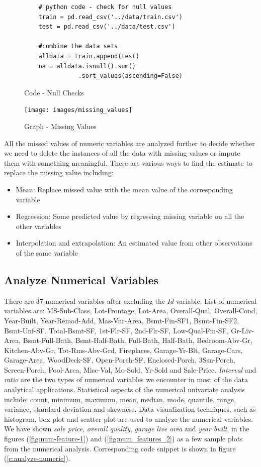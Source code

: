 \documentclass[sigconf]{acmart}
\begin{document}
	\begin{figure}[htb]
	\begin{verbatim}		
	# python code - check for null values
	train = pd.read_csv('../data/train.csv')
	test = pd.read_csv('../data/test.csv')
		
	#combine the data sets
	alldata = train.append(test)	
	na = alldata.isnull().sum()
	           .sort_values(ascending=False)
	\end{verbatim}
	\caption{Code - Null Checks}\label{c:check-nulls}
	\end{figure}
	
	\begin{figure}[htb]
		\centering
		\texttt{[image: images/missing\_values]}	
		\caption{Graph - Missing Values} \label{fig:missing-values} 
	\end{figure}

	All the missed values of numeric variables are analyzed further to decide whether we need to delete the instances of all the data with missing values or impute them with something meaningful. There are various ways to find the estimate to replace the missing value including:  
	
	\begin{itemize}
		\item Mean: Replace missed value with the mean value of the corresponding variable
		\item Regression: Some predicted value by regressing missing variable on all the other variables
		\item Interpolation and extrapolation: An estimated value from other observations of the same variable
	\end{itemize}
    
	\subsection{Analyze Numerical Variables}
    There are 37 numerical variables after excluding the {\em Id} variable. List of numerical variables are: MS-Sub-Class, Lot-Frontage, Lot-Area, Overall-Qual, Overall-Cond, Year-Built, Year-Remod-Add, Mas-Vnr-Area, Bsmt-Fin-SF1, Bsmt-Fin-SF2, Bsmt-Unf-SF, Total-Bsmt-SF, 1st-Flr-SF, 2nd-Flr-SF, Low-Qual-Fin-SF, Gr-Liv-Area, Bsmt-Full-Bath, Bsmt-Half-Bath, Full-Bath, Half-Bath, Bedroom-Abv-Gr, Kitchen-Abv-Gr, Tot-Rms-Abv-Grd, Fireplaces, Garage-Yr-Blt, Garage-Cars, Garage-Area, WoodDeck-SF, Open-Porch-SF, Enclosed-Porch, 3Ssn-Porch, Screen-Porch, Pool-Area, Misc-Val, Mo-Sold, Yr-Sold and Sale-Price. {\em Interval} and {\em ratio} are the two types of numerical variables we encounter in most of the data analytical applications. Statistical aspects of the numerical univariate analysis include: count, minimum, maximum, mean, median, mode, quantile, range, variance, standard deviation and skewness. Data visualization techniques, such as histogram, box plot and scatter plot are used to analyze the numerical variables. We have shown {\em sale price}, {\em overall quality}, {\em garage live area} and {\em year built}, in the figures (\ref{fig:num-feature-1}) and (\ref{fig:num_features_2}) as a few sample plots from the numerical analysis. Corresponding code snippet is shown in figure (\ref{c:analyze-numeric}).
	
\end{document}
